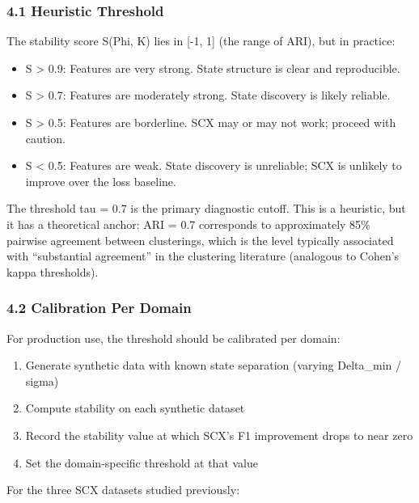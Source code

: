 \documentclass[
  12pt,
]{article}
\providecommand{\tightlist}{%
  \setlength{\itemsep}{0pt}\setlength{\parskip}{0pt}}
\begin{document}
\subsubsection{4.1 Heuristic Threshold}\label{heuristic-threshold}

The stability score S(Phi, K) lies in {[}-1, 1{]} (the range of ARI),
but in practice:

\begin{itemize}
\tightlist
\item
  S \textgreater{} 0.9: Features are very strong. State structure is
  clear and reproducible.
\item
  S \textgreater{} 0.7: Features are moderately strong. State discovery
  is likely reliable.
\item
  S \textgreater{} 0.5: Features are borderline. SCX may or may not
  work; proceed with caution.
\item
  S \textless{} 0.5: Features are weak. State discovery is unreliable;
  SCX is unlikely to improve over the loss baseline.
\end{itemize}

The threshold tau = 0.7 is the primary diagnostic cutoff. This is a
heuristic, but it has a theoretical anchor: ARI = 0.7 corresponds to
approximately 85\% pairwise agreement between clusterings, which is the
level typically associated with ``substantial agreement'' in the
clustering literature (analogous to Cohen's kappa thresholds).

\subsubsection{4.2 Calibration Per Domain}\label{calibration-per-domain}

For production use, the threshold should be calibrated per domain:

\begin{enumerate}
\def\labelenumi{\arabic{enumi}.}
\tightlist
\item
  Generate synthetic data with known state separation (varying
  Delta\_min / sigma)
\item
  Compute stability on each synthetic dataset
\item
  Record the stability value at which SCX's F1 improvement drops to near
  zero
\item
  Set the domain-specific threshold at that value
\end{enumerate}

For the three SCX datasets studied previously:
\end{document}
